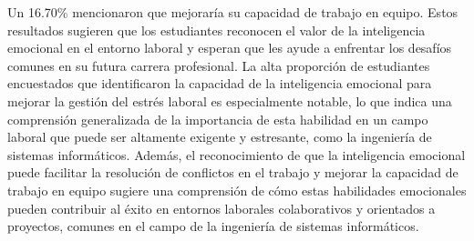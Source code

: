 \documentclass[journal]{IEEEtran}
\begin{document}
\begin{enumerate}
{Un 16.70\% mencionaron que mejoraría su capacidad de trabajo en equipo.
Estos resultados sugieren que los estudiantes reconocen el valor de la inteligencia emocional en el entorno laboral y esperan que les ayude a enfrentar los desafíos comunes en su futura carrera profesional.
La alta proporción de estudiantes encuestados que identificaron la capacidad de la inteligencia emocional para mejorar la gestión del estrés laboral es especialmente notable, lo que indica una comprensión generalizada de la importancia de esta habilidad en un campo laboral que puede ser altamente exigente y estresante, como la ingeniería de sistemas informáticos.
Además, el reconocimiento de que la inteligencia emocional puede facilitar la resolución de conflictos en el trabajo y mejorar la capacidad de trabajo en equipo sugiere una comprensión de cómo estas habilidades emocionales pueden contribuir al éxito en entornos laborales colaborativos y orientados a proyectos, comunes en el campo de la ingeniería de sistemas informáticos.
}\\


\end{enumerate}
\end{document}
